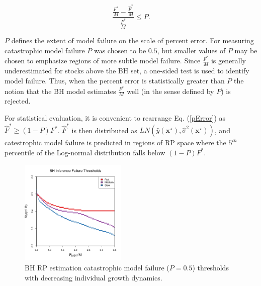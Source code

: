 %
\begin{equation}
\frac{\frac{F^*}{M}-\frac{\hat{F}^*}{M}}{\frac{F^*}{M}}\le P. \label{pError}
\end{equation}

%
$P$ defines the extent of model failure on the scale of percent error. For
measuring catastrophic model failure $P$ was chosen to be $0.5$, but smaller values
of $P$ may be chosen to emphasize regions of more subtle model failure. %
%
Since $\frac{F^*}{M}$ is generally underestimated for stocks above the BH set, a 
one-sided test is used to identify model failure.
Thus, when the percent error is statistically greater than $P$ the notion that
the BH model estimates $\frac{F^*}{M}$ well (in the sense defined by $P$) is rejected.

%
For statistical evaluation, it is convenient to rearrange Eq. (\ref{pError})
as \mbox{$\hat{F}^*\ge (1-P)F^*$}. $\hat{F}^*$ is then distributed as $LN(\hat y(\textbf{x}^\star), \hat \sigma^2(\textbf{x}^\star))$,
and catestrophic model failure is predicted
in regions of RP space where the $5^{th}$ percentile of the 
Log-normal distribution falls below \mbox{$(1-P)F^*$.}

\begin{figure}
\includegraphics[width=0.45\textwidth]{../ddBias/relErrorImagesBHDD0.5.png}
\vspace{-0.5cm}
\caption{BH RP estimation catastrophic model failure ($P=0.5$) thresholds with decreasing individual growth dynamics.
}\label{breaks}
\end{figure}

